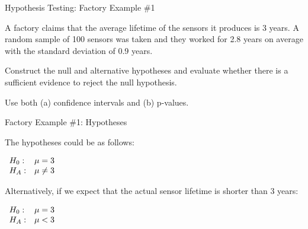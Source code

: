 \begin{frame}{Hypothesis Testing: Factory Example \#1}
     \begin{example}
         \medskip
         A factory claims that the average lifetime of the sensors it produces is 3 years. A random sample of 100 sensors was taken and they worked for 2.8 years on average with the standard deviation of 0.9 years.
         
         Construct the null and alternative hypotheses and evaluate whether there is a sufficient evidence to reject the null hypothesis.
         
         Use both (a) confidence intervals and (b) p-values.
     \end{example}
\end{frame}

\begin{frame}{Factory Example \#1: Hypotheses}

    The hypotheses could be as follows:

    \begin{math}
        \begin{array}{l l}
            H_0: &\mu = 3\\
            H_A: &\mu \ne 3
        \end{array}
    \end{math}
    \medskip
    
    Alternatively, if we expect that the actual sensor lifetime is shorter than 3 years:
    
    \begin{math}
        \begin{array}{l l}
            H_0: &\mu = 3\\
            H_A: &\mu < 3
        \end{array}
    \end{math}
    
\end{frame}

